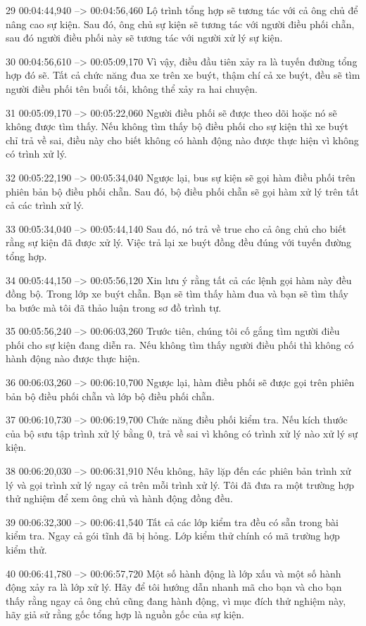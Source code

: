 29
00:04:44,940 --> 00:04:56,460
Lộ trình tổng hợp sẽ tương tác với cả ông chủ để nâng cao sự kiện.  Sau đó, ông chủ sự kiện sẽ tương tác với người điều phối chẵn, sau đó người điều phối này sẽ tương tác với người xử lý sự kiện.

30
00:04:56,610 --> 00:05:09,170
Vì vậy, điều đầu tiên xảy ra là tuyến đường tổng hợp đó sẽ.  Tất cả chức năng đua xe trên xe buýt, thậm chí cả xe buýt, đều sẽ tìm người điều phối tên buổi tối, không thể xảy ra hai chuyện.

31
00:05:09,170 --> 00:05:22,060
Người điều phối sẽ được theo dõi hoặc nó sẽ không được tìm thấy.  Nếu không tìm thấy bộ điều phối cho sự kiện thì xe buýt chỉ trả về sai, điều này cho biết không có hành động nào được thực hiện vì không có trình xử lý.

32
00:05:22,190 --> 00:05:34,040
Ngược lại, bus sự kiện sẽ gọi hàm điều phối trên phiên bản bộ điều phối chẵn.  Sau đó, bộ điều phối chẵn sẽ gọi hàm xử lý trên tất cả các trình xử lý.

33
00:05:34,040 --> 00:05:44,140
Sau đó, nó trả về true cho cả ông chủ cho biết rằng sự kiện đã được xử lý.  Việc trả lại xe buýt đồng đều đúng với tuyến đường tổng hợp.

34
00:05:44,150 --> 00:05:56,120
Xin lưu ý rằng tất cả các lệnh gọi hàm này đều đồng bộ.  Trong lớp xe buýt chẵn.  Bạn sẽ tìm thấy hàm đua và bạn sẽ tìm thấy ba bước mà tôi đã thảo luận trong sơ đồ trình tự.

35
00:05:56,240 --> 00:06:03,260
Trước tiên, chúng tôi cố gắng tìm người điều phối cho sự kiện đang diễn ra.  Nếu không tìm thấy người điều phối thì không có hành động nào được thực hiện.

36
00:06:03,260 --> 00:06:10,700
Ngược lại, hàm điều phối sẽ được gọi trên phiên bản bộ điều phối chẵn và lớp bộ điều phối chẵn.

37
00:06:10,730 --> 00:06:19,700
Chức năng điều phối kiểm tra.  Nếu kích thước của bộ sưu tập trình xử lý bằng 0, trả về sai vì không có trình xử lý nào xử lý sự kiện.

38
00:06:20,030 --> 00:06:31,910
Nếu không, hãy lặp đến các phiên bản trình xử lý và gọi trình xử lý ngay cả trên mỗi trình xử lý.  Tôi đã đưa ra một trường hợp thử nghiệm để xem ông chủ và hành động đồng đều.

39
00:06:32,300 --> 00:06:41,540
Tất cả các lớp kiểm tra đều có sẵn trong bài kiểm tra.  Ngay cả gói tĩnh đã bị hỏng.  Lớp kiểm thử chính có mã trường hợp kiểm thử.

40
00:06:41,780 --> 00:06:57,720
Một số hành động là lớp xấu và một số hành động xảy ra là lớp xử lý.  Hãy để tôi hướng dẫn nhanh mã cho bạn và cho bạn thấy rằng ngay cả ông chủ cũng đang hành động, vì mục đích thử nghiệm này, hãy giả sử rằng gốc tổng hợp là nguồn gốc của sự kiện.

